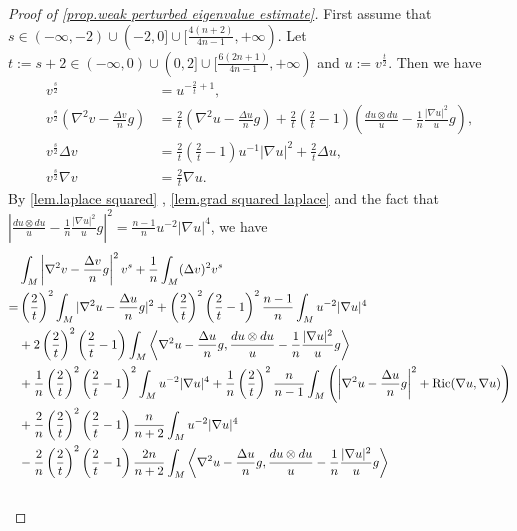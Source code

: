 \documentclass[12pt]{amsart}
\numberwithin{equation}{section}
\numberwithin{lemma}{section}
\numberwithin{proposition}{section}
\numberwithin{corollary}{section}
\numberwithin{remark}{section}
\begin{document}
\begin{proof}[Proof of \cref{prop.weak perturbed eigenvalue estimate}]
        First assume that $s\in(-\infty,-2)\cup(-2,0]\cup [\frac{4(n+2)}{4n-1},+\infty)$. Let $t:=s+2\in(-\infty,0)\cup(0,2]\cup[\frac{6(2n+1)}{4n-1},+\infty)$ and $u:=v^{\frac{t}{2}}$. Then we have
    \begin{align*}
        v^{\frac{s}{2}}&=u^{-\frac{2}{t}+1},\\
        v^{\frac{s}{2}}(\nabla^2 v-\frac{\Delta v}{n}g)
    &=\frac{2}{t}
    \left(\nabla^2 u-\frac{\Delta u}{n}g\right)
    +\frac{2}{t}\left(\frac{2}{t}-1\right)
    \left(\frac{du\otimes du}{u}-\frac{1}{n}\frac{|\nabla u|^2}{u}g\right),\\
    v^{\frac{s}{2}}\Delta v&=\frac{2}{t}
    \left(\frac{2}{t}-1\right)
    u^{-1}|\nabla u|^2+\frac{2}{t}\Delta u,\\
    v^{\frac{s}{2}}\nabla v&=\frac{2}{t}\nabla u.
    \end{align*}
    By \cref{lem.laplace squared} , \cref{lem.grad squared laplace} and the fact that $|\frac{du\otimes du}{u}-\frac{1}{n}\frac{|\nabla u|^2}{u}g|^2=\frac{n-1}{n}u^{-2}|\nabla u|^4$, we have
    \begin{align*}
        &\int_M \left|\nabla^2 v-\frac{\Delta v}{n}g\right|^2 v^{s}
        +\frac{1}{n}\int_M (\Delta v)^2v^{s}\notag\\\notag
        =&\left(\frac{2}{t}\right)^2
        \int_M |\nabla^2 u-\frac{\Delta u}{n}g|^2
        +\left(\frac{2}{t}\right)^2
        \left(\frac{2}{t}-1\right)^2
        \frac{n-1}{n}
        \int_M u^{-2}|\nabla u|^4\\\notag
        &+2\left(\frac{2}{t}\right)^2
        \left(\frac{2}{t}-1\right)
        \int_M\left\langle\nabla^2 u-\frac{\Delta u}{n}g,\frac{du\otimes du}{u}-\frac{1}{n}\frac{|\nabla u|^2}{u}g\right\rangle\\\notag
        &+\frac{1}{n}
        \left(\frac{2}{t}\right)^2
        \left(\frac{2}{t}-1\right)^2
        \int_M u^{-2}|\nabla u|^4
        +\frac{1}{n}
        \left(\frac{2}{t}\right)^2\frac{n}{n-1}\int_M \left(\left|\nabla^2 u-\frac{\Delta u}{n}g\right|^2
        +\mathrm{Ric}(\nabla u,\nabla u)\right)\\\notag
        &+\frac{2}{n}\left(\frac{2}{t}\right)^2
        \left(\frac{2}{t}-1\right)
        \frac{n}{n+2}\int_M u^{-2}|\nabla u|^4\notag\\
        &-\frac{2}{n}
        \left(\frac{2}{t}\right)^2
        \left(\frac{2}{t}-1\right)
        \frac{2n}{n+2}\int_M \left\langle\nabla^2 u-\frac{\Delta u}{n}g,\frac{du\otimes du}{u}-\frac{1}{n}\frac{|\nabla u|^2}{u}g\right\rangle\\\notag

\end{align*}
\end{proof}
\end{document}
